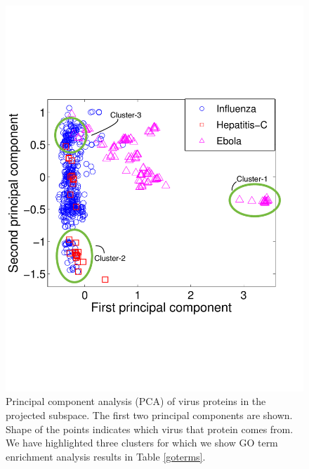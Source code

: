\documentclass{bioinfo}
\begin{document}
\begin{figure}[h]
\centering
\includegraphics[scale=0.27, trim = 0 5.6cm 0 6cm]{pca_with_clusters.pdf}
\caption{Principal component analysis (PCA) of virus proteins in the projected subspace. The first two principal components are shown. Shape of the points indicates which virus that protein comes from. We have highlighted three clusters for which we show GO term enrichment analysis results in Table \ref{goterms}.}%
\label{fig:pca2}
\end{figure}
\end{document}
